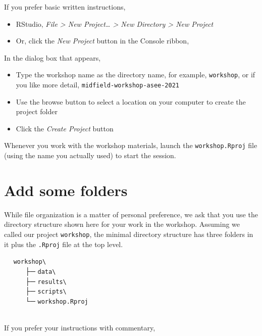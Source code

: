 \documentclass[
]{book}
\providecommand{\tightlist}{%
  \setlength{\itemsep}{0pt}\setlength{\parskip}{0pt}}
\begin{document}
If you prefer basic written instructions,

\begin{itemize}
\tightlist
\item
  RStudio, \emph{File \textgreater{} New Project\ldots{} \textgreater{} New Directory \textgreater{} New Project}
\item
  Or, click the \emph{New Project} button in the Console ribbon,
\end{itemize}

In the dialog box that appears,

\begin{itemize}
\tightlist
\item
  Type the workshop name as the directory name, for example, \texttt{workshop}, or if you like more detail, \texttt{midfield-workshop-asee-2021}\\
\item
  Use the browse button to select a location on your computer to create the project folder\\
\item
  Click the \emph{Create Project} button
\end{itemize}

Whenever you work with the workshop materials, launch the \texttt{workshop.Rproj} file (using the name you actually used) to start the session.

\hypertarget{add-some-folders}{%
\section*{Add some folders}\label{add-some-folders}}

While file organization is a matter of personal preference, we ask that you use the directory structure shown here for your work in the workshop. Assuming we called our project \texttt{workshop}, the minimal directory structure has three folders in it plus the \texttt{.Rproj} file at the top level.

  \texttt{workshop\textbackslash{}}\\
   ├─ \texttt{data\textbackslash{}}\\
   ├─ \texttt{results\textbackslash{}}\\
   ├─ \texttt{scripts\textbackslash{}}\\
   └─ \texttt{workshop.Rproj}\\
 

If you prefer your instructions with commentary,
\end{document}
